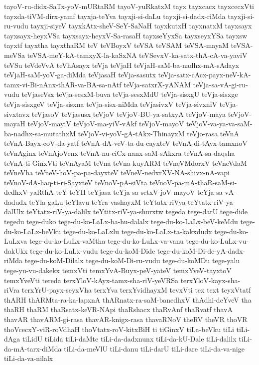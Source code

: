 {tayoV-ru-didx-SaTx-yoV-mURtaRM
tayoV-yuRkatxM
tayx
tayxcacx
tayxcecxVti
tayxda-tiVM-dirx-yamf
tayxja-teYva
tayxji-si-daLu
tayxji-si-dadx-riMda
tayxji-si-ru-vudu
tayxji-siyeV
tayxkAtx-sheV-SeY-SaNaH
tayxkutxH
tayxnatxM
tayxsayx
tayxsayx-heyxVSa
tayxsayx-heyxV-Sa-rasaH
tayxseYyxSa
tayxseyxYSa
tayxsw
tayxtf
tayxtha
tayxthaRM
teV
teVBoyxV
teVSA
teVSAM
teVSA-mayaM
teVSA-meVSa
teVSA-meY-kA-tamxyX-la-kaSxNA
teVSevxV-ka-satx-thA-cA-va-yaviV
teVSu
teVdeVvA
teVhAsayx
teVja
teVjaH
teVjaH-saM-ba-nadhx-mA-sAdayx
teVjaH-saM-yoV-ga-diMda
teVjasaH
teVja-sasutx
teVja-satx-cAcx-payx-neV-kA-tamx-vi-Bi-nAnx-thAR-va-BA-sa-nAtf
teVja-satxrX-yANAM
teVja-sa-vA-gi-ru-vudu
teVjaseVsx
teVja-sesxM-buva
teVja-sesxMdU
teVja-sisxgU
teVja-sisxge
teVja-sisxgeV
teVja-sisxna
teVja-sisx-niMda
teVjasivxV
teVja-sivxniV
teVja-sivxtavx
teVjasoV
teVjasusx
teVjoV
teVjoV-BU-ya-satxyA
teVjoV-maya
teVjoV-mayaH
teVjoV-mayiV
teVjoV-ma-yiV-vAkf
teVjoV-mayoV
teVjoV-va-ya-va-saM-ba-nadhx-sa-mutathxM
teVjoV-vi-yoV-gA-tAkx-ThinayxM
teVjo-rasa
teVnA
teVnA-Bayx-coV-da-yatf
teVnA-dA-veV-ta-du-cayxteV
teVnA-di-tAyx-tamxnoV
teVnAginx
teVnAjoVcnx
teVnA-nu-ciCx-nanx-saM-sAkxra
teVnA-sa-daqsha
teVnA-ti-GinxVti
teVnAyaM
teVna
teVna-kuyARM
teVneVMdorxV
teVneVdaM
teVneVha
teVneV-hoV-pa-pa-dayxteV
teVneV-nedxrXV-NA-shivx-nA-vapi
teVnoV-dA-haq-ti-ri-SayxteV
teVnoV-pA-siVta
teVnoV-pa-mA-thaR-saM-si-dedhxV-yaRthA
teY
teYH
teYjasa
teYja-sa-setxV-joV-mayoV
teYja-sa-vA-dadudx
teYla-gaLu
teYlavu
teYra-vashayxM
teYtatx-riVya
teYtatx-riV-ya-dalUlx
teYtatx-riV-ya-dalilx
teYtitx-riV-ya-shurxtw
tegeda
tege-darU
tege-dide
tegedu
tege-duko
tege-du-ko-LaLx-ba-hu-dalalx
tege-du-ko-LaLx-beV-keMdu
tege-du-ko-LaLx-beVku
tege-du-ko-LaLxlu
tege-du-ko-LaLx-ta-kakxdudx
tege-du-ko-LuLxva
tege-du-ko-LuLx-vaMtha
tege-du-ko-LuLx-va-vanu
tege-du-ko-LuLx-vu-dakUkx
tege-du-ko-LuLx-vudu
tege-du-koM-Dide
tege-du-koM-Di-de-yA-dadx-riMda
tege-du-koM-Dilalx
tege-du-koM-Di-ru-vudu
tege-du-koMDu
tege-yalu
tege-yu-vu-dakekx
temxVti
temxYvA-Buyx-peV-yateV
temxYveV-tayxtoV
temxYveVti
tereda
terxYloV-kAyx-tamx-sha-riV-yeVRSa
terxYloV-kayx-sha-riVra
terxYrU-payx-seyxVha
terxYva
terxYvidhayxM
tevxVti
tex
text
teyxVtatf
thARH
thARMta-ra-ka-lapxnA
thARnatx-ra-saM-banedhxV
thAdhi-deYveV
tha
thaRH
thaRM
thaRsatx-keVR-NApi
thaRshacx
thaRvAnf
thaRvatf
thavA
thavAR
thavARM-gi-rasa
thavAR-knigx-rasa
thavaRNoV
theRV
theVR
thoVR
thoVcecxY-viR-roVdhaH
thoVtatx-roV-kitxBiH
ti
tiGinxV
tiLa-beVku
tiLi
tiLi-dAga
tiLidU
tiLida
tiLi-daMte
tiLi-da-dadxnunx
tiLi-da-kU-Dale
tiLi-dalilx
tiLi-da-mA-tarx-diMda
tiLi-da-meVlU
tiLi-danu
tiLi-darU
tiLi-dare
tiLi-da-va-nige
tiLi-da-va-nilalx
}
